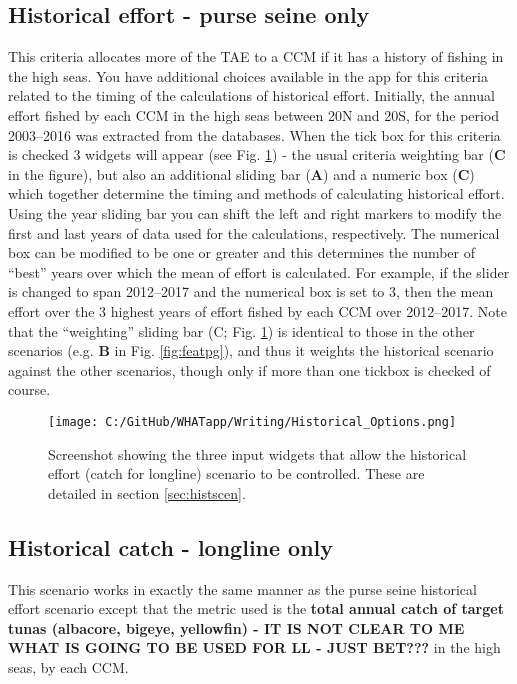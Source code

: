 \documentclass[11pt]{article}
\begin{document}
\subsection*{Historical effort - purse seine only} \label{sec:histscen}
This criteria allocates more of the TAE to a CCM if it has a history of fishing in the high seas. You have additional choices available in the app for this criteria related to the timing of the calculations of historical effort. Initially, the annual effort fished by each CCM in the high seas between 20\degree N and 20\degree S, for the period 2003--2016 was extracted from the databases. When the tick box for this criteria is checked 3 widgets will appear (see Fig. \ref{fig:HistOp}) - the usual criteria weighting bar ({\bf C} in the figure), but also an additional sliding bar ({\bf A}) and a numeric box ({\bf C}) which together determine the timing and methods of calculating historical effort. Using the year sliding bar you can shift the left and right markers to modify the first and last years of data used for the calculations, respectively. The numerical box can be modified to be one or greater and this determines the number of ``best'' years over which the mean of effort is calculated. For example, if the slider is changed to span 2012--2017 and the numerical box is set to 3, then the mean effort over the 3 highest years of effort fished by each CCM over 2012--2017. Note that the ``weighting'' sliding bar ({C}; Fig. \ref{fig:HistOp}) is identical to those in the other scenarios (e.g. {\bf B} in Fig. \ref{fig:featpg}), and thus it weights the historical scenario against the other scenarios, though only if more than one tickbox is checked of course.

\newpage
 \begin{figure} [h]
  \centering
\texttt{[image: C:/GitHub/WHATapp/Writing/Historical\_Options.png]}
  \caption {Screenshot showing the three input widgets that allow the historical effort (catch for longline) scenario to be controlled. These are detailed in section \ref{sec:histscen}.}
  \label{fig:HistOp}
\end{figure}

\subsection*{Historical catch - longline only}
This scenario works in exactly the same manner as the purse seine historical effort scenario except that the metric used is the {\bf total annual catch of target tunas (albacore, bigeye, yellowfin) - IT IS NOT CLEAR TO ME WHAT IS GOING TO BE USED FOR LL - JUST BET???} in the high seas, by each CCM.
\end{document}
